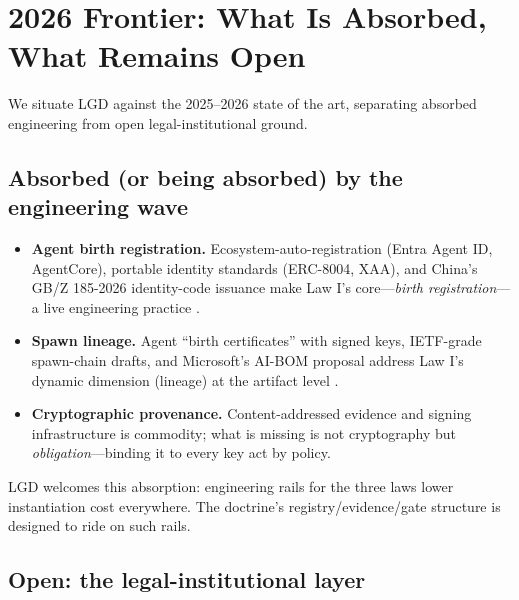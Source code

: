 \documentclass[12pt]{article}
\begin{document}
\section{2026 Frontier: What Is Absorbed, What Remains Open}\label{sec:frontier}

We situate LGD against the 2025--2026 state of the art, separating absorbed engineering from open legal-institutional ground.

\subsection{Absorbed (or being absorbed) by the engineering wave}

\begin{itemize}[itemsep=2pt]
  \item \textbf{Agent birth registration.} Ecosystem-auto-registration (Entra Agent ID, AgentCore), portable identity standards (ERC-8004, XAA), and China's GB/Z 185-2026 identity-code issuance make Law I's core---\emph{birth registration}---a live engineering practice \cite{agentrace,gbz185}.
  \item \textbf{Spawn lineage.} Agent ``birth certificates'' with signed keys, IETF-grade spawn-chain drafts, and Microsoft's AI-BOM proposal address Law I's dynamic dimension (lineage) at the artifact level \cite{agentrace}.
  \item \textbf{Cryptographic provenance.} Content-addressed evidence and signing infrastructure is commodity; what is missing is not cryptography but \emph{obligation}---binding it to every key act by policy.
\end{itemize}

LGD welcomes this absorption: engineering rails for the three laws lower instantiation cost everywhere. The doctrine's registry/evidence/gate structure is designed to ride on such rails.

\subsection{Open: the legal-institutional layer}
\end{document}
